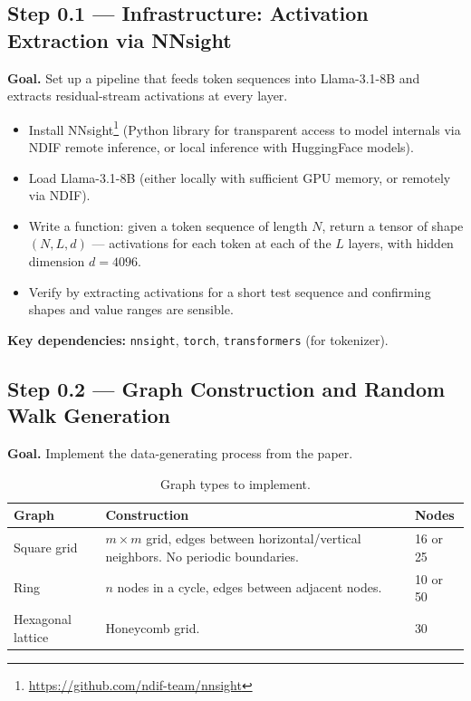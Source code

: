 \documentclass[11pt]{article}
\begin{document}
\subsection{Step 0.1 --- Infrastructure: Activation Extraction via NNsight}

\textbf{Goal.} Set up a pipeline that feeds token sequences into Llama-3.1-8B and extracts residual-stream activations at every layer.

\begin{itemize}
    \item Install NNsight\footnote{\url{https://github.com/ndif-team/nnsight}} (Python library for transparent access to model internals via NDIF remote inference, or local inference with HuggingFace models).
    \item Load Llama-3.1-8B (either locally with sufficient GPU memory, or remotely via NDIF).
    \item Write a function: given a token sequence of length $N$, return a tensor of shape $(N, L, d)$ --- activations for each token at each of the $L$ layers, with hidden dimension $d = 4096$.
    \item Verify by extracting activations for a short test sequence and confirming shapes and value ranges are sensible.
\end{itemize}

\textbf{Key dependencies:} \texttt{nnsight}, \texttt{torch}, \texttt{transformers} (for tokenizer).

\subsection{Step 0.2 --- Graph Construction and Random Walk Generation}

\textbf{Goal.} Implement the data-generating process from the paper.

\begin{table}[h]
\centering
\begin{tabular}{@{}lll@{}}
\toprule
\textbf{Graph} & \textbf{Construction} & \textbf{Nodes} \\
\midrule
Square grid & $m \times m$ grid, edges between horizontal/vertical neighbors. No periodic boundaries. & 16 or 25 \\
Ring & $n$ nodes in a cycle, edges between adjacent nodes. & 10 or 50 \\
Hexagonal lattice & Honeycomb grid. & 30 \\
\bottomrule
\end{tabular}
\caption{Graph types to implement.}
\end{table}
\end{document}
